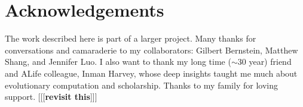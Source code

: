 \documentclass[letterpaper]{article}
\begin{document}
\section{Acknowledgements}
\label{sec:ack}

The work described here is part of a larger project. Many thanks for conversations and camaraderie to my collaborators: Gilbert Bernstein, Matthew Shang, and Jennifer Luo. I also want to thank my long time ($\sim$30 year) friend and ALife colleague, Inman Harvey, whose deep insights taught me much about evolutionary computation and scholarship. Thanks to my family for loving support. [[[\textbf{revisit this}]]]






\end{document}
